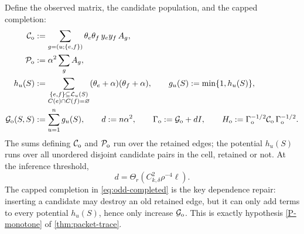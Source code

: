 \documentclass[11pt]{article}
\theoremstyle{definition}
\theoremstyle{remark}
\newcommand{\1}{\mathbf 1}
\newcommand{\cC}{\mathcal C}
\newcommand{\cG}{\mathcal G}
\newcommand{\cL}{\mathcal L}
\newcommand{\cP}{\mathcal P}
\numberwithin{equation}{section}
\begin{document}
Define the observed matrix, the candidate population, and the capped
completion:
\begin{align}
 \cC_{\rm o}&:=\sum_{g=(u;\{e,f\})}\theta_e\theta_f\,y_ey_f\,A_g,
 \label{eq:odd-C}\\
 \cP_{\rm o}&:=\alpha^2\sum_gA_g,
 \label{eq:odd-population}\\
 h_u(S)&:=\sum_{\substack{\{e,f\}\subseteq\cL_u(S)\\
 C(e)\cap C(f)=\varnothing}}(\theta_e+\alpha)(\theta_f+\alpha),
 \qquad
 g_u(S):=\min\{1,h_u(S)\},
 \label{eq:odd-completed}\\
 \cG_{\rm o}(S,S)&:=\sum_{u=1}^ng_u(S),
 \qquad
 d:=n\alpha^2,
 \qquad
 \Gamma_{\rm o}:=\cG_{\rm o}+dI,
 \qquad
 H_{\rm o}:=\Gamma_{\rm o}^{-1/2}\cC_{\rm o}\,\Gamma_{\rm o}^{-1/2}.
 \label{eq:odd-H}
\end{align}
The sums defining $\cC_{\rm o}$ and $\cP_{\rm o}$ run over the retained
edges; the potential $h_u(S)$ runs over all unordered disjoint
candidate pairs in the cell, retained or not.  At the inference
threshold,
\begin{equation}\label{eq:odd-d-scale}
 d=\Theta_r(C_{k,\delta}^2\rho^{-4}\ell).
\end{equation}
The capped completion in \cref{eq:odd-completed} is the key dependence
repair: inserting a candidate may destroy an old retained edge, but it
can only add terms to every potential $h_u(S)$, hence only increase
$\cG_{\rm o}$.  This is exactly hypothesis \ref{P-monotone} of
\cref{thm:packet-trace}.
\end{document}
